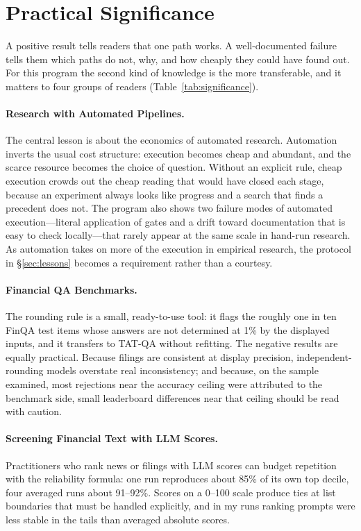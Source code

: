 \documentclass[11pt]{article}
\begin{document}
\section{Practical Significance}
\label{sec:significance}

A positive result tells readers that one path works. A well-documented failure tells them which paths do not, why, and how cheaply they could have found out. For this program the second kind of knowledge is the more transferable, and it matters to four groups of readers (Table~\ref{tab:significance}).

\paragraph{Research with Automated Pipelines.} The central lesson is about the economics of automated research. Automation inverts the usual cost structure: execution becomes cheap and abundant, and the scarce resource becomes the choice of question. Without an explicit rule, cheap execution crowds out the cheap reading that would have closed each stage, because an experiment always looks like progress and a search that finds a precedent does not. The program also shows two failure modes of automated execution---literal application of gates and a drift toward documentation that is easy to check locally---that rarely appear at the same scale in hand-run research. As automation takes on more of the execution in empirical research, the protocol in \S\ref{sec:lessons} becomes a requirement rather than a courtesy.

\paragraph{Financial QA Benchmarks.} The rounding rule is a small, ready-to-use tool: it flags the roughly one in ten FinQA test items whose answers are not determined at 1\% by the displayed inputs, and it transfers to TAT-QA without refitting. The negative results are equally practical. Because filings are consistent at display precision, independent-rounding models overstate real inconsistency; and because, on the sample examined, most rejections near the accuracy ceiling were attributed to the benchmark side, small leaderboard differences near that ceiling should be read with caution.

\paragraph{Screening Financial Text with LLM Scores.} Practitioners who rank news or filings with LLM scores can budget repetition with the reliability formula: one run reproduces about 85\% of its own top decile, four averaged runs about 91--92\%. Scores on a 0--100 scale produce ties at list boundaries that must be handled explicitly, and in my runs ranking prompts were less stable in the tails than averaged absolute scores.
\end{document}
